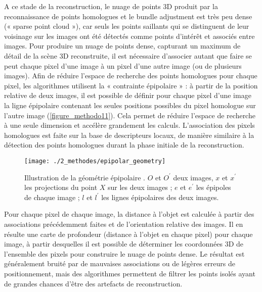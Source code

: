 A ce stade de la reconstruction, le nuage de points 3D produit par la reconnaissance de points homologues et le bundle adjustment est très peu dense (« sparse point cloud »), car seuls les points saillants qui se distinguent de leur voisinage sur les images ont été détectés comme points d’intérêt et associés entre images. Pour produire un nuage de points dense, capturant un maximum de détail de la scène 3D reconstruite, il est nécessaire d’associer autant que faire se peut chaque pixel d’une image à un pixel d’une autre image (ou de plusieurs images). Afin de réduire l’espace de recherche des points homologues pour chaque pixel, les algorithmes utilisent la « contrainte épipolaire » \citep{forstner_photogrammetric_2016} : à partir de la position relative de deux images, il est possible de définir pour chaque pixel d’une image la ligne épipolaire contenant les seules positions possibles du pixel homologue sur l’autre image (\autoref{figure_methodo11}). Cela permet de réduire l’espace de recherche à une seule dimension et accélère grandement les calculs. L’association des pixels homologues est faite sur la base de descripteurs locaux, de manière similaire à la détection des points homologues durant la phase initiale de la reconstruction.

\begin{figure}[H]
	\begin{center}
	\texttt{[image: ./2\_methodes/epipolar\_geometry]}
		\caption[Illustration de la géométrie épipolaire]{Illustration de la géométrie épipolaire \citep{emmanouil_comparison_2015}. $O$ et $O^\prime$ deux images, $x$ et $x^\prime$ les projections du point $X$ sur les deux images ; $e$ et $e^\prime$ les épipoles de chaque image ; $l$ et $l^\prime$ les lignes épipolaires des deux images.}
	\label{figure_methodo11}
\end{center}
\end{figure}

Pour chaque pixel de chaque image, la distance à l’objet est calculée à partir des associations précédemment faites et de l’orientation relative des images. Il en résulte une carte de profondeur (distance à l’objet en chaque pixel) pour chaque image, à partir desquelles il est possible de déterminer les coordonnées 3D de l’ensemble des pixels pour construire le nuage de points dense. Le résultat est généralement bruité par de mauvaises associations ou de légères erreurs de positionnement, mais des algorithmes permettent de filtrer les points isolés ayant de grandes chances d’être des artefacts de reconstruction.

